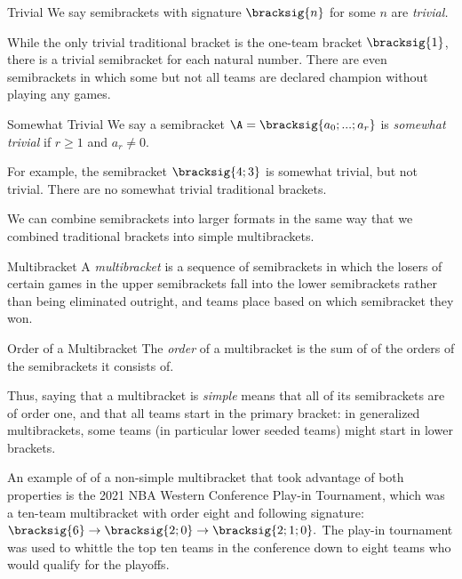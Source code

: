 {    \begin{definition}{Trivial}{}
        We say semibrackets with signature $\bracksig{n}$ for some $n$ are \textit{trivial.}
    \end{definition}

    While the only trivial traditional bracket is the one-team bracket $\bracksig{1}$, there is a trivial semibracket for each natural number. There are even semibrackets in which some but not all teams are declared champion without playing any games.

    \begin{definition}{Somewhat Trivial}{}
        We say a semibracket $\A = \bracksig{a_0; ...; a_r}$ is \textit{somewhat trivial} if $r \geq 1$ and $a_r \neq 0.$
    \end{definition}

    For example, the semibracket $\bracksig{4;3}$ is somewhat trivial, but not trivial. There are no somewhat trivial traditional brackets.

    We can combine semibrackets into larger formats in the same way that we combined traditional brackets into simple multibrackets.

    \begin{definition}{Multibracket}{} 
        A \textit{multibracket} is a sequence of semibrackets in which the losers of certain games in the upper semibrackets fall into the lower semibrackets rather than being eliminated outright, and teams place based on which semibracket they won.
    \end{definition}

    \begin{definition}{Order of a Multibracket}{}
        The \textit{order} of a multibracket is the sum of of the orders of the semibrackets it consists of.
    \end{definition}

    Thus, saying that a multibracket is \textit{simple} means that all of its semibrackets are of order one, and that all teams start in the primary bracket: in generalized multibrackets, some teams (in particular lower seeded teams) might start in lower brackets.
    
    An example of of a non-simple multibracket that took advantage of both properties is the 2021 NBA Western Conference Play-in Tournament, which was a ten-team multibracket with order eight and following signature:
    $\bracksig{6} \to \bracksig{2;0} \to \bracksig{2;1;0}.$ The play-in tournament was used to whittle the top ten teams in the conference down to eight teams who would qualify for the playoffs.

}
